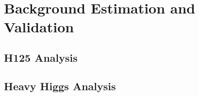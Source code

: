 
\chapter{Background Estimation and Validation}
\label{bg_val}


\section{H125 Analysis}
\label{h125_bg_val}



\section{Heavy Higgs Analysis}
\label{hh_bg_val}



%
% 
% 
